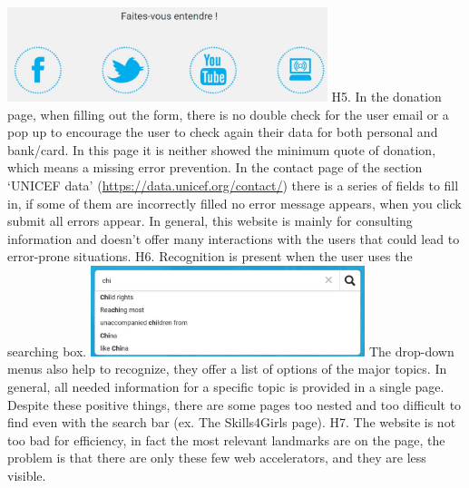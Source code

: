 \newline \includegraphics[width=0.7\textwidth]{FinalScores11.jpg}
\newline
\newline H5.	In the donation page, when filling out the form, there is no double check for the user email or a pop up to encourage the user to check again their data for both personal and bank/card.
In this page it is neither showed the minimum quote of donation, which means a missing error prevention.
\newline In the contact page of the section ‘UNICEF data’ (\href {https://data.unicef.org/contact/}{https://data.unicef.org/contact/}) there is a series of fields to fill in, if some of them are incorrectly filled no error message appears, when you click submit all errors appear.
\newline In general, this website is mainly for consulting information and doesn’t offer many interactions with the users that could lead to error-prone situations.
\newline
\newline H6.	Recognition is present when the user uses the searching box.
\newline \includegraphics[width=0.6\textwidth]{FinalScores12.jpg}
\newline The drop-down menus also help to recognize, they offer a list of options of the major topics.
\newline In general, all needed information for a specific topic is provided in a single page.
\newline Despite these positive things, there are some pages too nested and too difficult to find even with the search bar (ex. The Skills4Girls page).
\newline
\newline H7.	The website is not too bad for efficiency, in fact the most relevant landmarks are on the page, the problem is that there are only these few web accelerators, and they are less visible.
